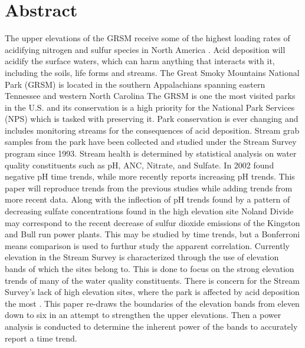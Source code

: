 \chapter*{Abstract}\label{ch:abstract}
The upper elevations of the GRSM receive some of the highest loading rates of acidifying nitrogen and sulfur species in North America \citep{johnson1992atmospheric}.  
Acid deposition will acidify the surface waters, which can harm anything that interacts with it, including the soils, life forms and streams.
The Great Smoky Mountains National Park (GRSM) is located in the southern Appalachians spanning eastern Tennessee and western North Carolina
The GRSM is one the most visited parks in the U.S. and its conservation is a high priority for the National Park Services (NPS) which is tasked with preserving it.        
Park conservation is ever changing and  includes monitoring streams for the consequences of acid deposition.    
Stream grab samples from the park have been collected and studied under the Stream Survey program since 1993.
Stream health is determined by statistical analysis on water quality constituents such as pH, ANC, Nitrate, and Sulfate.
In 2002 \citet{robinson2008ph} found negative pH time trends, while more recently \citet{cai2013} reports increasing pH trends.
This paper will reproduce trends from the previous studies while adding trends from more recent data.
Along with the inflection of pH trends found by \citet{cai2013}  a pattern of decreasing sulfate concentrations found in the high elevation site Noland Divide may correspond to the recent decrease of sulfur dioxide emissions of the Kingston and Bull run power plants.
This may be studied by time trends, but a Bonferroni means comparison is used to furthur study the apparent correlation.
Currently elevation in the Stream Survey is characterized through the use of  elevation bands of which the sites belong to.
This is done to focus on the strong elevation trends of many of the water quality constituents.%
There is concern for the Stream Survey's lack of high elevation sites, where the park is affected by acid deposition the most \citep{weathers2006}.
This paper re-draws the boundaries of the elevation bands from eleven down to six in an attempt to strengthen the upper elevations.
Then a power analysis is conducted to determine the inherent power of the bands to accurately report a time trend.

